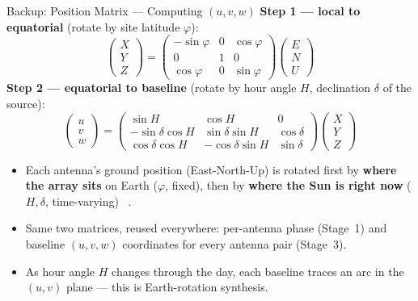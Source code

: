 \documentclass{beamer}
\newcounter{sframe}[section]
\renewcommand{\thesframe}{\thesection.\arabic{sframe}}
\newcommand{\ftitle}[1]{\stepcounter{sframe}{\normalsize\thesframe}\quad #1}
\begin{document}
\begin{frame}{\ftitle{Backup: Position Matrix --- Computing $(u,v,w)$}}
\footnotesize
\textbf{Step 1 --- local to equatorial} (rotate by site latitude
$\varphi$):
\[
\begin{pmatrix}X\\Y\\Z\end{pmatrix} =
\begin{pmatrix}
-\sin\varphi & 0 & \cos\varphi\\
0 & 1 & 0\\
\cos\varphi & 0 & \sin\varphi
\end{pmatrix}
\begin{pmatrix}E\\N\\U\end{pmatrix}
\]
\textbf{Step 2 --- equatorial to baseline} (rotate by hour angle $H$,
declination $\delta$ of the source):
\[
\begin{pmatrix}u\\v\\w\end{pmatrix} =
\begin{pmatrix}
\sin H & \cos H & 0\\
-\sin\delta\cos H & \sin\delta\sin H & \cos\delta\\
\cos\delta\cos H & -\cos\delta\sin H & \sin\delta
\end{pmatrix}
\begin{pmatrix}X\\Y\\Z\end{pmatrix}
\]
\begin{itemize}
  \setlength{\itemsep}{2pt}
  \item Each antenna's ground position (East-North-Up) is rotated first
  by \textbf{where the array sits} on Earth ($\varphi$, fixed), then by
  \textbf{where the Sun is right now} ($H,\delta$, time-varying)
  ~\cite{tms2017}.
  \item Same two matrices, reused everywhere: per-antenna phase (Stage~1)
  and baseline $(u,v,w)$ coordinates for every antenna pair (Stage~3).
  \item As hour angle $H$ changes through the day, each baseline traces
  an arc in the $(u,v)$ plane --- this is Earth-rotation synthesis.
\end{itemize}
\end{frame}
\end{document}

